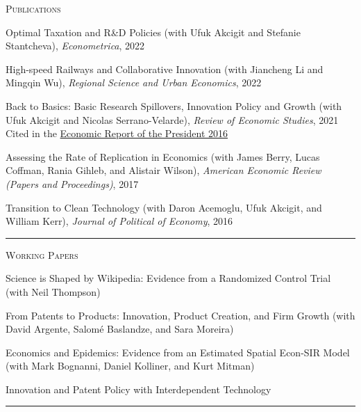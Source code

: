 \documentclass{article}
\begin{document}
\parbox{\textwidth}{
\parbox[t]{0.28\textwidth}{ \raggedright \noindent \textsc{ Publications } }
\parbox[t]{0.72\textwidth}{ \raggedright

Optimal Taxation and R\&D Policies (with Ufuk Akcigit and Stefanie Stantcheva), \textit{Econometrica}, 2022
\vspace{0.27cm}

High-speed Railways and Collaborative Innovation (with Jiancheng Li and Mingqin Wu), \textit{Regional Science and Urban Economics}, 2022
\vspace{0.27cm}

Back to Basics: Basic Research Spillovers, Innovation Policy and Growth (with Ufuk Akcigit and Nicolas Serrano-Velarde), \textit{Review of Economic Studies}, 2021  \\
 Cited in the \href{https://www.gpo.gov/fdsys/pkg/ERP-2016/pdf/ERP-2016.pdf}{Economic Report of the President 2016}
\vspace{0.27cm}

Assessing the Rate of Replication in Economics (with James Berry, Lucas Coffman, Rania Gihleb, and Alistair Wilson), \textit{American Economic Review (Papers and Proceedings)}, 2017
\vspace{0.27cm}

Transition to Clean Technology (with Daron Acemoglu, Ufuk Akcigit, and William Kerr), \textit{Journal of Political of Economy}, 2016
\vspace{0.27cm}

}
\textcolor{light-gray}{\hrule}
}
\vspace{0.3cm}

\parbox{\textwidth}{
\parbox[t]{0.28\textwidth}{ \raggedright \noindent \textsc{ Working Papers } }
\parbox[t]{0.72\textwidth}{ \raggedright

Science is Shaped by Wikipedia: Evidence from a Randomized Control Trial (with Neil Thompson)
\vspace{0.27cm}

From Patents to Products: Innovation, Product Creation, and Firm Growth (with David Argente, Salomé Baslandze, and Sara Moreira)
\vspace{0.27cm}

Economics and Epidemics: Evidence from an Estimated Spatial Econ-SIR Model (with Mark Bognanni, Daniel Kolliner, and Kurt Mitman)
\vspace{0.27cm}

Innovation and Patent Policy with Interdependent Technology
\vspace{0.27cm}

}
\textcolor{light-gray}{\hrule}
}
\vspace{0.3cm}
\end{document}
